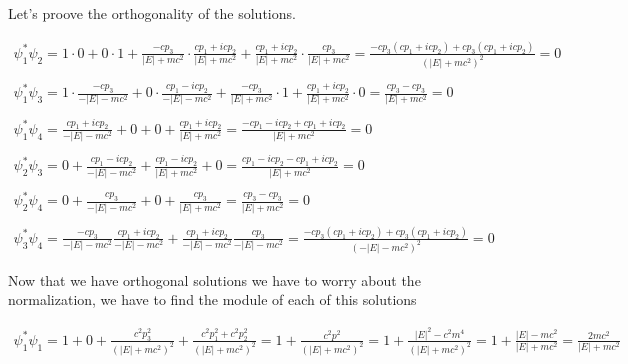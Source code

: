 Let's proove the orthogonality of the solutions.


\begin{equation}
  \begin{array}{c}
    \psi_1^* \psi_2 = 1 \cdot 0 + 0 \cdot 1 + \frac{-cp_3}{|E|+mc^2} \cdot \frac{cp_1+icp_2}{|E|+mc^2} + \frac{cp_1+icp_2}{|E|+mc^2} \cdot \frac{cp_3}{|E|+mc^2} = \frac{-cp_3(cp_1+icp_2)+cp_3(cp_1+icp_2)}{(|E|+mc^2)^2} = 0
    \\

    \\
    \psi_1^* \psi_3 = 1 \cdot \frac{-cp_3}{-|E|-mc^2} + 0 \cdot \frac{cp_1-icp_2}{-|E|-mc^2} + \frac{-cp_3}{|E|+mc^2} \cdot 1 + \frac{cp_1+icp_2}{|E|+mc^2} \cdot 0 = \frac{cp_3-cp_3}{|E|+mc^2} = 0
    \\

    \\
    \psi_1^* \psi_4 = \frac{cp_1+icp_2}{-|E|-mc^2} + 0 + 0 + \frac{cp_1+icp_2}{|E|+mc^2} = \frac{-cp_1-icp_2+cp_1+icp_2}{|E|+mc^2} = 0
    \\

    \\
    \psi_2^* \psi_3 = 0 + \frac{cp_1-icp_2}{-|E|-mc^2} + \frac{cp_1-icp_2}{|E|+mc^2} + 0 = \frac{cp_1-icp_2-cp_1+icp_2}{|E|+mc^2} = 0
    \\

    \\
    \psi_2^* \psi_4 = 0 + \frac{cp_3}{-|E|-mc^2} + 0 + \frac{cp_3}{|E|+mc^2} = \frac{cp_3-cp_3}{|E|+mc^2} = 0
    \\

    \\
    \psi_3^* \psi_4 = \frac{-cp_3}{-|E|-mc^2}\frac{cp_1+icp_2}{-|E|-mc^2} + \frac{cp_1+icp_2}{-|E|-mc^2}\frac{cp_3}{-|E|-mc^2} = \frac{-cp_3(cp_1+icp_2)+cp_3(cp_1+icp_2)}{(-|E|-mc^2)^2} = 0
  \end{array}
\end{equation}

Now that we have orthogonal solutions we have to worry about the normalization, we have to find the module of each of this solutions

\begin{equation}
  \begin{array}{c}
    \psi_1^*\psi_1 = 1 + 0 + \frac{c^2p_3^2}{(|E|+mc^2)^2}+\frac{c^2p_1^2+c^2p_2^2}{(|E|+mc^2)^2} = 1 + \frac{c^2p^2}{(|E|+mc^2)^2} = 1 + \frac{|E|^2-c^2m^4}{(|E|+mc^2)^2} = 1 + \frac{|E|-mc^2}{|E|+mc^2} = \frac{2mc^2}{|E|+mc^2}
  \end{array}
\end{equation}

